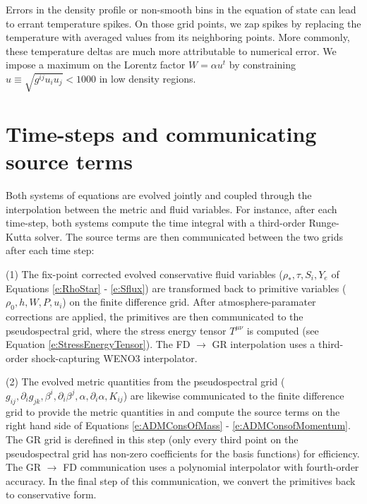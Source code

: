 Errors in the density profile or non-smooth bins in the equation of state can lead to errant temperature spikes.  On those grid points, we zap spikes by replacing the temperature with averaged values from its neighboring points.  More commonly, these temperature deltas are much more attributable to numerical error.  We impose a maximum on the Lorentz factor $W = \alpha u^t$ by constraining $u \equiv \sqrt{g^{ij} u_i u_j} < 1000$ in low density regions.



\section{Time-steps and communicating source terms}
\label{sec:communication}

Both systems of equations are evolved jointly and coupled through the interpolation between the metric and fluid variables. 
For instance, after each time-step, both systems compute the time integral with a third-order Runge-Kutta solver.
The source terms are then communicated between the two grids after each time step:

(1) The fix-point corrected evolved conservative fluid variables ($\rho_*, \tau, S_i, Y_e$ of Equations \ref{e:RhoStar} - \ref{e:Sflux}) are transformed back to primitive variables ($\rho_0, h, W, P, u_i$) on the finite difference grid.  After atmosphere-paramater corrections are applied, the primitives are then communicated to the pseudospectral grid, where the stress energy tensor $T^{\mu\nu}$ is computed (see Equation \ref{e:StressEnergyTensor}).  The FD $\rightarrow$ GR interpolation uses a third-order shock-capturing WENO3 interpolator. 

(2) The evolved metric quantities from the pseudospectral grid ($g_{ij}, \partial_i g_{jk}, \beta^i, \partial_i \beta^j, \alpha, \partial_i \alpha,  K_{ij}$) are likewise communicated to the finite difference grid to provide the metric quantities in and compute the source terms on the right hand side of Equations \ref{e:ADMConsOfMass} - \ref{e:ADMConsofMomentum}.  The GR grid is derefined in this step (only every third point on the pseudospectral grid has non-zero coefficients for the basis functions) for efficiency.  The GR $\rightarrow$ FD communication uses a polynomial interpolator with fourth-order accuracy.
In the final step of this communication, we convert the primitives back to conservative form.

